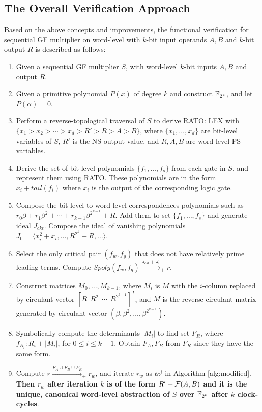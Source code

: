 \subsection{The Overall Verification Approach}
Based on the above concepts and improvements, the functional verification for sequential GF multiplier 
on word-level with $k$-bit input operands $A,B$ and $k$-bit output $R$ is described as follows:
\begin{enumerate}[{1)}]
\item Given a sequential GF multiplier $S$, with word-level $k$-bit inputs $A,B$ and output $R$.
\item Given a primitive polynomial $P(x)$ of degree $k$ and construct ${\mathbb{F}}_{2^k}$, and let $P(\alpha)=0$.
\item Perform a reverse-topological traversal of $S$ to derive RATO: LEX with $\{x_1>x_2>\cdots>x_d>R'>R>A>B\}$,
where $\{x_1,\dots,x_d\}$ are bit-level variables of $S$, $R'$ is the NS output value, and 
$R,A,B$ are word-level PS variables.
\item Derive the set of bit-level polynomials $\{f_1,\dots,f_s\}$ from each gate in $S$, and represent them 
using RATO. These polynomials are in the form $x_i+tail(f_i)$ where $x_i$ is the output of the corresponding logic gate.
\item Compose the bit-level to word-level correspondences polynomials such as $r_0\beta+r_1\beta^2+\cdots+r_{k-1}\beta^{2^{k-1}}+R$.
Add them to set $\{f_1,\dots,f_s\}$ and generate ideal $J_{ckt}$. Compose the ideal of vanishing polynomials
$J_0 = \langle x_i^2+x_i, \dots, R^{2^k}+R,\dots\rangle$.
\item Select the only critical pair $(f_w,f_g)$ that does not have relatively prime leading terms. Compute
$Spoly(f_w,f_g) \xrightarrow{J_{ckt}+J_0}_{+}r$.
\item Construct matrices $M_0,\dots,M_{k-1}$, where $M_i$ is $M$ with the $i$-column replaced by circulant vector 
$[R~~R^2~~\cdots~~R^{2^{k-1}}]^T$, and $M$ is the reverse-circulant matrix generated by circulant vector $(\beta,\beta^2,\dots,\beta^{2^{k-1}})$.
\item Symbolically compute the determinants $|M_i|$ to find set $F_R$, where $f_{R_i}:R_i+|M_i|$, for $0\leq i \leq k-1$.
Obtain $F_A, F_B$ from $F_R$ since they have the same form.
\item Compute $r \xrightarrow{F_A\cup F_B \cup F_R}_{+}r_w$, and iterate $r_w$ as $to^i$ in Algorithm \ref{alg:modified}.
{\bf Then $r_w$ after iteration $k$ is of the form $R'+{\mathcal{F}}(A,B)$ and it is the unique, canonical word-level abstraction
of $S$ over ${\mathbb{F}}_{2^k}$ after $k$ clock-cycles}.
\end{enumerate}

